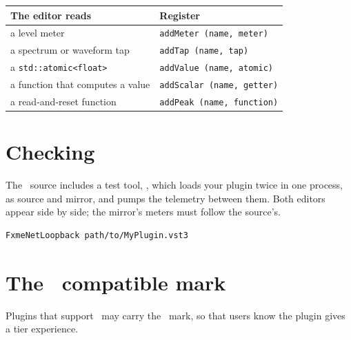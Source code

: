 \begin{longtable}{@{}p{}p{}@{}}
\toprule
\textbf{The editor reads} & \textbf{Register}\\
\midrule
\endhead
a level meter & \texttt{addMeter (name, meter)}\\
a spectrum or waveform tap & \texttt{addTap (name, tap)}\\
a \texttt{std::atomic<float>} & \texttt{addValue (name, atomic)}\\
a function that computes a value & \texttt{addScalar (name, getter)}\\
a read-and-reset function & \texttt{addPeak (name, function)}\\
\bottomrule
\end{longtable}

\section{Checking}

The \fxme\ source includes a test tool, , which loads
your plugin twice in one process, as source and mirror, and pumps the
telemetry between them. Both editors appear side by side; the mirror's
meters must follow the source's.

\begin{lstlisting}
FxmeNetLoopback path/to/MyPlugin.vst3
\end{lstlisting}

\section{The \fxme\ compatible mark}
\label{sec:stamp}

Plugins that support \fxme\ may carry the \fxme\ mark, so that users know the
plugin gives a tier  experience.

\begin{center}
  \qquad
\end{center}

